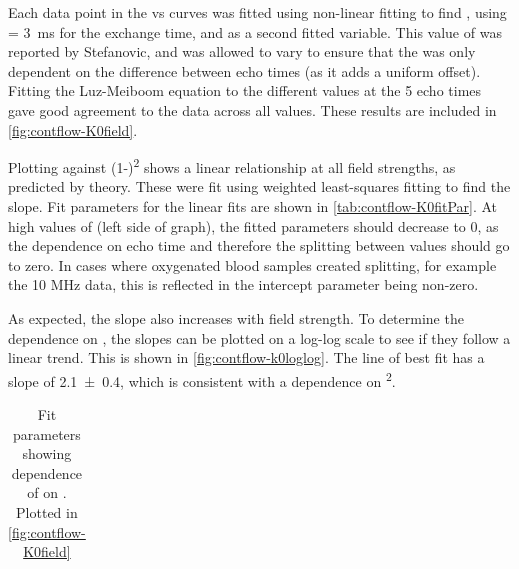 Each data point in the \Rtwo vs \SOtwo curves was fitted using non-linear fitting to find \Kzero, using  \Texc =  \SI{3}{ms} for the exchange time, and \TtwoO as a second fitted variable.
This value of \Texc was reported by Stefanovic\cite{StefanovicHumanwholebloodrelaxometry2004}, and \TtwoO was allowed to vary to ensure that the \Kzero was only dependent on the difference between echo times (as it adds a uniform offset).
Fitting the Luz-Meiboom equation to the different \Rtwo values at the 5 echo times gave good agreement to the data across all \SOtwo values.
These results are included in \autoref{fig:contflow-K0field}.

Plotting \Kzero against (1-\SOtwo)\textsuperscript{2} shows a linear relationship at all field strengths, as predicted by theory.
These were fit using weighted least-squares fitting to find the slope.
Fit parameters for the linear fits are shown in \autoref{tab:contflow-K0fitPar}.
At high values of \SOtwo (left side of graph), the fitted \Kzero parameters should decrease to 0, as the dependence on echo time and therefore the splitting between \Ttwo values should go to zero.
In cases where oxygenated blood samples created splitting, for example the 10 MHz data, this is reflected in the intercept parameter being non-zero.

As expected, the slope also increases with field strength.
To determine the dependence on \Bzero, the slopes can be plotted on a log-log scale to see if they follow a linear trend.
This is shown in \autoref{fig:contflow-k0loglog}.
The line of best fit has a slope of \num{2.1\pm0.4}, which is consistent with a dependence on \Bzero\textsuperscript{2}.

\begin{table}[t]

\centering
\begin{tabular}{|c|cc|c|}
\hline

\hline
\end{tabular}
\caption[Fit parameters for dependence of \Kzero on \SOtwo]{Fit parameters showing dependence of \Kzero on \SOtwo. Plotted in \autoref{fig:contflow-K0field}}
\label{tab:contflow-K0fitPar}
\end{table}

